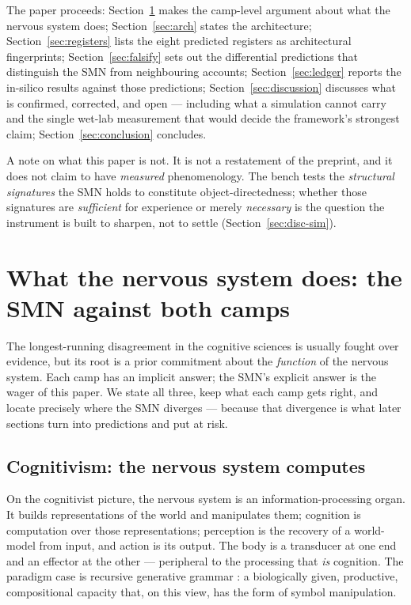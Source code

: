 \documentclass[utf8]{FrontiersinHarvard} %
\begin{document}
The paper proceeds: Section~\ref{sec:camps} makes the camp-level argument about what the nervous system does; Section~\ref{sec:arch} states the architecture; Section~\ref{sec:registers} lists the eight predicted registers as architectural fingerprints; Section~\ref{sec:falsify} sets out the differential predictions that distinguish the SMN from neighbouring accounts; Section~\ref{sec:ledger} reports the in-silico results against those predictions; Section~\ref{sec:discussion} discusses what is confirmed, corrected, and open --- including what a simulation cannot carry and the single wet-lab measurement that would decide the framework's strongest claim; Section~\ref{sec:conclusion} concludes.

A note on what this paper is not. It is not a restatement of the preprint, and it does not claim to have \emph{measured} phenomenology. The bench tests the \emph{structural signatures} the SMN holds to constitute object-directedness; whether those signatures are \emph{sufficient} for experience or merely \emph{necessary} is the question the instrument is built to sharpen, not to settle (Section~\ref{sec:disc-sim}).

\section{What the nervous system does: the SMN against both camps}\label{sec:camps}

The longest-running disagreement in the cognitive sciences is usually fought over evidence, but its root is a prior commitment about the \emph{function} of the nervous system. Each camp has an implicit answer; the SMN's explicit answer is the wager of this paper. We state all three, keep what each camp gets right, and locate precisely where the SMN diverges --- because that divergence is what later sections turn into predictions and put at risk.

\subsection{Cognitivism: the nervous system computes}\label{sec:cog}

On the cognitivist picture, the nervous system is an information-processing organ. It builds representations of the world and manipulates them; cognition is computation over those representations; perception is the recovery of a world-model from input, and action is its output. The body is a transducer at one end and an effector at the other --- peripheral to the processing that \emph{is} cognition. The paradigm case is recursive generative grammar \citep{chomsky1957syntactic}: a biologically given, productive, compositional capacity that, on this view, has the form of symbol manipulation.
\end{document}
